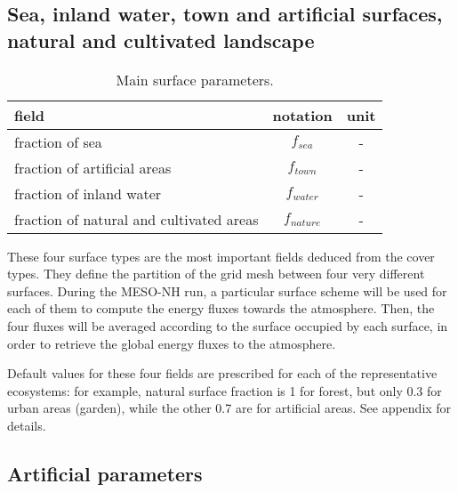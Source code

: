 
\subsection{Sea, inland water, town and artificial surfaces, natural and
cultivated landscape}

\begin{table}[h]
\hspace*{2.cm}
\begin{tabular}{||l|c|c||}
\hline
\hline
field & notation &  unit \\
\hline
\hline
 fraction of sea & $f_{sea}$ & - \\
 fraction of artificial areas & $f_{town}$ &- \\
 fraction of inland water & $f_{water}$ & - \\
 fraction of natural and cultivated areas &$f_{nature}$ &  - \\
\hline
\hline
\end{tabular}
\caption{Main surface parameters.
\label{paramSURF}}
\end{table}

These four surface types
are the most important fields deduced from the
cover types. They define the partition of the grid mesh between four
very different surfaces.
During the MESO-NH run,
a particular surface scheme will be used for each of them to compute the
energy fluxes towards the atmosphere. Then, the four fluxes will be
averaged according to the surface occupied by each surface, in order to
retrieve the global energy fluxes to the atmosphere.

Default values for these four fields are prescribed for each of the
representative ecosystems: for example,
natural surface fraction is 1 for forest, but only 0.3 for urban areas
(garden), while the other 0.7 are for artificial areas. See appendix for
details.


\subsection{Artificial parameters}


